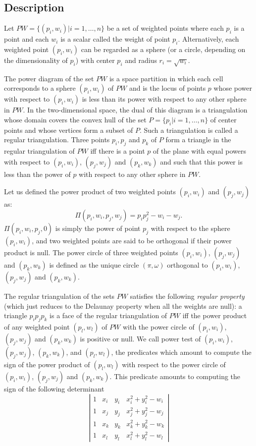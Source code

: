 \subsection{Description\label{Subsection_2D_Triangulations_Regular_Description}}
Let ${  PW} = \{(p_i, w_i) | i = 1, \ldots , n \}$ be a set of 
weighted points where each $p_i$ is a point and each $w_i$
is a scalar called the weight of point $p_i$.
Alternatively, each weighted point $(p_i, w_i)$ can be regarded
as a sphere (or a circle, depending on the dimensionality
of $p_i$)  with center $p_i$ and radius $r_i=\sqrt{w_i}$.

The power diagram of the set ${  PW}$ is a space partition in which
 each cell corresponds to a sphere $(p_i, w_i)$ of ${  PW}$
and is the locus of points  $p$ whose power with respect to $(p_i, w_i)$
is less than its power with respect to any other sphere 
in ${  PW}$. In the two-dimensional space,
the dual of this diagram is a triangulation 
whose domain covers the convex hull of the set 
${  P}= \{ p_i | i = 1, \ldots , n \}$ of center points
and whose vertices form a subset of ${  P}$.
Such a triangulation is called a regular triangulation.
Three points $p_i, p_j$ and $p_k$ of ${  P}$
form a triangle in the regular triangulation of ${  PW}$
iff there is a point $p$ of the plane with equal 
powers with respect to $(p_i, w_i)$, $(p_j, w_j)$
and $(p_k, w_k)$ and such that this power 
is  less than the power of $p$
with respect to any other sphere in  ${  PW}$.

Let us defined the power product of two weighted points
$(p_i, w_i)$ and $(p_j, w_j)$ as:
\[\Pi(p_i, w_i, p_j, w_j) = p_ip_j ^2 - w_i  - w_j  .\]
$\Pi(p_i, w_i, p_j, 0)$ is simply the power of point $p_j$
with respect to the sphere $(p_i, w_i)$, and two weighted points 
are said to be orthogonal if their power product is null.
The power circle of three weighted points
 $(p_i, w_i)$, $(p_j, w_j)$
and $(p_k, w_k)$ is defined as the unique circle
$(\pi, \omega)$  orthogonal to
 $(p_i, w_i)$, $(p_j, w_j)$
and $(p_k, w_k)$.

The regular triangulation of the sets ${  PW}$
satisfies the following {\em regular property} (which just reduces to the 
Delaunay property when all the weights are null):
a triangle $p_ip_jp_k$ is a face of the regular triangulation
of ${  PW}$ iff the power product of any weighted point
 $(p_l, w_l)$ of ${  PW}$ with the power circle of
 $(p_i, w_i)$, $(p_j, w_j)$ and $(p_k, w_k)$ is positive or null.
We call  power test of  $(p_i, w_i)$, $(p_j, w_j)$, $(p_k, w_k)$,
and $(p_l, w_l)$,  the predicates which amount to compute
the sign of 
the power product of $(p_l, w_l)$ with respect to
the power circle of
 $(p_i, w_i)$, $(p_j, w_j)$ and $(p_k, w_k)$.
This predicate amounts to computing the sign of
the following
determinant
\[\left| \begin{array}{cccc}
1  &  x_i  &  y_i  &  x_i ^2 + y_i ^2 - w_i  \\
1  &  x_j  &  y_j  &  x_j ^2 + y_j ^2 - w_j  \\
1  &  x_k  &  y_k  &  x_k ^2 + y_k ^2 - w_k  \\
1  &  x_l  &  y_l  &  x_l ^2 + y_l ^2 - w_l
\end{array}
\right|
\]

